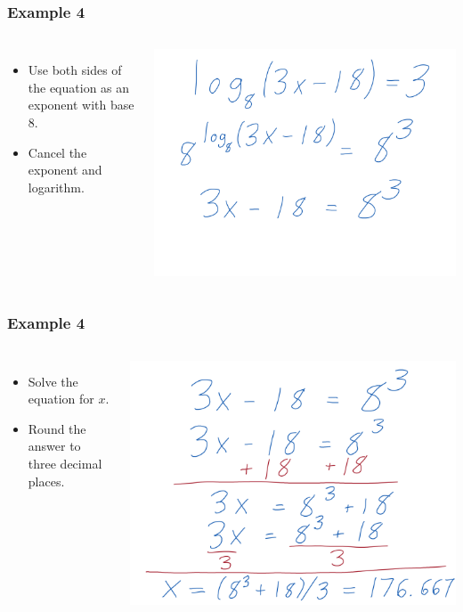 \documentclass[aspectratio=169,17pt]{beamer}
\begin{document}
\begin{frame}
	\frametitle{Example 4}
	\begin{columns}
		\begin{itemize}\small
			\item Use both sides of the equation as an exponent with base $8$.
			\item Cancel the exponent and logarithm.
		\end{itemize}
			\includegraphics[width=\textwidth]{logarithmic_equations-work_09.png}
	\end{columns}
\end{frame}

\begin{frame}
	\frametitle{Example 4}
	\begin{columns}
		\column{0.3\textwidth}
		\begin{itemize} \small
			\item Solve the equation for $x$.
			\item Round the answer to three decimal places.
		\end{itemize}
		\column{0.7\textwidth}
			\includegraphics[width=\textwidth]{logarithmic_equations-work_10.png}
	\end{columns}
\end{frame}
\end{document}
